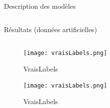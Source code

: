 \documentclass[final]{beamer}
\newlength{\onecolwid}
\newlength{\twocolwid}
\begin{document}
\begin{frame}[t]
\begin{columns}[t]
\begin{column}{\twocolwid}
\begin{block}{Description des modèles}
\begin{columns}[t,totalwidth=\twocolwid]
\begin{column}{\onecolwid}
\end{column} %

\end{columns} %

\end{block}


\vspace{-1cm}


\begin{alertblock}{Résultats (données artificielles)}


\begin{columns}[t,totalwidth=0.45\paperwidth] %

\begin{column}{\onecolwid} %


\begin{figure}
    \centering
    \texttt{[image: vraisLabels.png]}
    \caption{VraisLabels}
    \label{fig:my_label}
\end{figure}

\begin{figure}
    \centering
    \texttt{[image: vraisLabels.png]}
    \caption{VraisLabels}
    \label{fig:my_label}
\end{figure}

\end{column} %

\begin{column}{\onecolwid} %


\end{column}
\end{columns}
\end{alertblock}
\end{column}
\end{columns}
\end{frame}
\end{document}
